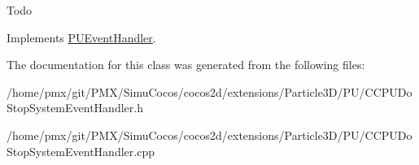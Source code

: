 Todo 

Implements \hyperlink{classPUEventHandler_a760172609708c65548dcac364c9b3b9c}{P\+U\+Event\+Handler}.



The documentation for this class was generated from the following files\+:\begin{DoxyCompactItemize}
\item 
/home/pmx/git/\+P\+M\+X/\+Simu\+Cocos/cocos2d/extensions/\+Particle3\+D/\+P\+U/C\+C\+P\+U\+Do\+Stop\+System\+Event\+Handler.\+h\item 
/home/pmx/git/\+P\+M\+X/\+Simu\+Cocos/cocos2d/extensions/\+Particle3\+D/\+P\+U/C\+C\+P\+U\+Do\+Stop\+System\+Event\+Handler.\+cpp\end{DoxyCompactItemize}
